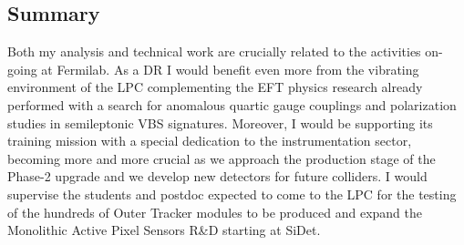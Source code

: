 {\begin{flushleft}
\section{Summary} 
\vspace{\baselineskip}
Both my analysis and technical work are crucially related to the activities on-going at Fermilab. As a DR I would benefit even more from the vibrating environment of the LPC  complementing the EFT physics research already performed with a search for anomalous quartic gauge couplings and polarization studies in semileptonic VBS signatures. Moreover, I would be supporting its training mission with a special dedication to the instrumentation sector, becoming more and more crucial as we approach the production stage of the Phase-2 upgrade and we develop new detectors for future colliders. I would supervise the students and postdoc expected to come to the LPC for the testing of the hundreds of Outer Tracker modules to be produced and expand the Monolithic Active Pixel Sensors R\&D starting at SiDet.



\end{flushleft}
}
